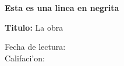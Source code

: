 
\bfseries Esta es una linea en negrita

{\bfseries Titulo:} La obra

\vspace{2cm}

\hspace{2cm}

\raggedright
\raggedleft
\centering

\indent
\noindent

\vfill

\begin{doublespace}
  Fecha de lectura:\\
  Califaci'on:
\end{doublespace}

\newpage
\thispagestyle{empty}
\mbox{}

\usepackage{emptypage}
\cleardoublepage
